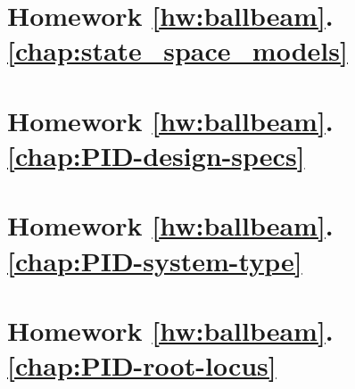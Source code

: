 	\section*{
		Homework \ref{hw:ballbeam}.\ref{chap:state_space_models}}  \label{hw:ballbeam_state_space}
		
	\section*{
		Homework \ref{hw:ballbeam}.\ref{chap:PID-design-specs}}  \label{hw:ballbeam_successive_loop_closure}
		
	\section*{
		Homework \ref{hw:ballbeam}.\ref{chap:PID-system-type}}  \label{hw:ballbeam_system_type}
		
	\section*{
		Homework \ref{hw:ballbeam}.\ref{chap:PID-root-locus}}  \label{hw:ballbeam_root_locus_PID}
		

